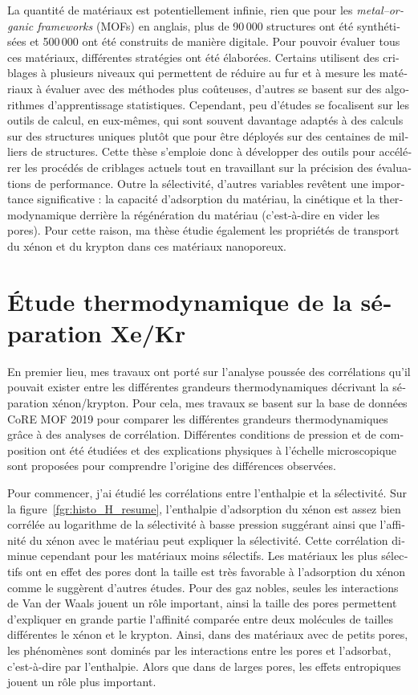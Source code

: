 \documentclass[thesis]{subfiles}
\begin{document}
\begin{otherlanguage}{french}
La quantité de matériaux est potentiellement infinie, rien que pour les \emph{metal--organic frameworks} (MOFs) en anglais, plus de 90\,000 structures ont été synthétisées et 500\,000 ont été construits de manière digitale. Pour pouvoir évaluer tous ces matériaux, différentes stratégies ont été élaborées. Certains utilisent des criblages à plusieurs niveaux qui permettent de réduire au fur et à mesure les matériaux à évaluer avec des méthodes plus coûteuses, d'autres se basent sur des algorithmes d'apprentissage statistiques. Cependant, peu d'études se focalisent sur les outils de calcul, en eux-mêmes, qui sont souvent davantage adaptés à des calculs sur des structures uniques plutôt que pour être déployés sur des centaines de milliers de structures. Cette thèse s'emploie donc à développer des outils pour accélérer les procédés de criblages actuels tout en travaillant sur la précision des évaluations de performance. Outre la sélectivité, d'autres variables revêtent une importance significative : la capacité d'adsorption du matériau, la cinétique et la thermodynamique derrière la régénération du matériau (c'est-à-dire en vider les pores). Pour cette raison, ma thèse étudie également les propriétés de transport du xénon et du krypton dans ces matériaux nanoporeux. 

\section*{\'Etude thermodynamique de la séparation Xe/Kr}

En premier lieu, mes travaux ont porté sur l'analyse poussée des corrélations qu'il pouvait exister entre les différentes grandeurs thermodynamiques décrivant la séparation xénon/krypton. Pour cela, mes travaux se basent sur la base de données CoRE MOF 2019 pour comparer les différentes grandeurs thermodynamiques grâce à des analyses de corrélation. Différentes conditions de pression et de composition ont été étudiées et des explications physiques à l'échelle microscopique sont proposées pour comprendre l'origine des différences observées. 

Pour commencer, j'ai étudié les corrélations entre l'enthalpie et la sélectivité. Sur la figure~\ref{fgr:histo_H_resume}, l'enthalpie d'adsorption du xénon est assez bien corrélée au logarithme de la sélectivité à basse pression suggérant ainsi que l'affinité du xénon avec le matériau peut expliquer la sélectivité. Cette corrélation diminue cependant pour les matériaux moins sélectifs. Les matériaux les plus sélectifs ont en effet des pores dont la taille est très favorable à l'adsorption du xénon comme le suggèrent d'autres études. Pour des gaz nobles, seules les interactions de Van der Waals jouent un rôle important, ainsi la taille des pores permettent d'expliquer en grande partie l'affinité comparée entre deux molécules de tailles différentes le xénon et le krypton. Ainsi, dans des matériaux avec de petits pores, les phénomènes sont dominés par les interactions entre les pores et l'adsorbat, c'est-à-dire par l'enthalpie. Alors que dans de larges pores, les effets entropiques jouent un rôle plus important.


\end{otherlanguage}
\end{document}
